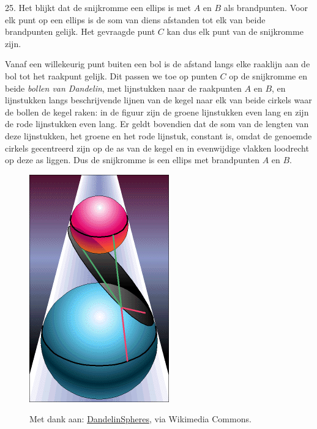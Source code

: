 \begin{problem}{25.}
	Het blijkt dat de snijkromme een ellips is met $A$ en $B$ als brand\-punten. Voor elk punt op een ellips is de som van diens afstanden tot elk van beide brandpunten gelijk. Het gevraagde punt $C$ kan dus elk punt van de snijkromme zijn.

    Vanaf een willekeurig punt buiten een bol is de afstand langs elke raaklijn aan de bol tot het raakpunt gelijk. Dit passen we toe op punten $C$ op de snijkromme en beide \textit{bollen van Dandelin}, met lijnstukken naar de raakpunten $A$ en $B$, en lijnstukken langs beschrij\-vende lijnen van de kegel naar elk van beide cirkels waar de bollen de kegel raken: in de figuur zijn de groene lijnstukken even lang en zijn de rode lijnstukken even lang. Er geldt bovendien dat de som van de lengten van deze lijnstukken, het groene en het rode lijnstuk, constant is, omdat de genoemde cirkels gecentreerd zijn op de as van de kegel en in evenwijdige vlakken loodrecht op deze as liggen. Dus de snijkromme is een ellips met brandpunten $A$ en $B$.
    \begin{figure}
		\includegraphics[scale=0.4]{resources/DandelinSpheres}

        \scriptsize{Met dank aan: \href{https://commons.wikimedia.org/wiki/File:DandelinSpheres.png?uselang=nl}{DandelinSpheres}, via Wikimedia Commons.}
	\end{figure}
\end{problem}

\clearpage

